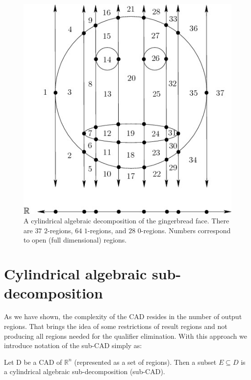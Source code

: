 \documentclass[
  digital, %
  twoside, %
  table,   %
  nolof,     %
  nolot,     %
]{fithesis3}
\begin{document}
\begin{figure}[H]
  \begin{center}
      \begin{minipage}{0.66\textwidth}
      \includegraphics[width=\textwidth]{fithesis/images/CADface.jpg} 
    \end{minipage}
  \end{center}
  \caption{ A cylindrical algebraic decomposition of the gingerbread face. There are $ 37$ $ 2$-regions, $ 64$ $ 1$-regions, and $ 28$ 0-regions. Numbers correspond to open (full dimensional) regions. \cite{LaValle:2006:PA:1213331}}
  \label{fig:gingerbreadCAD}
\end{figure}


\section{Cylindrical algebraic sub-decomposition}
As we have shown, the complexity of the CAD resides in the number of output regions. That brings the idea of some restrictions of result regions and not producing all regions needed for the qualifier elimination.
With this approach we introduce notation of the sub-CAD simply as:

\begin{definition}
Let D be a CAD of $\mathbb{R}^n$ (represented as a set of regions). Then a subset $E \subseteq D$ is a cylindrical algebraic sub-decomposition (sub-CAD).
\end{definition}
\end{document}
